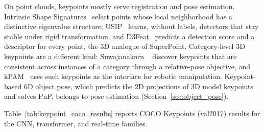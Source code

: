 On point clouds, keypoints mostly serve registration and pose estimation. Intrinsic Shape Signatures~\cite{zhong2009iss} select points whose local neighborhood has a distinctive eigenvalue structure; USIP~\cite{li2019usip} learns, without labels, detectors that stay stable under rigid transformation, and D3Feat~\cite{bai2020d3feat} predicts a detection score and a descriptor for every point, the 3D analogue of SuperPoint. Category-level 3D keypoints are a different kind: Suwajanakorn \etal~\cite{suwajanakorn2018discovery} discover keypoints that are consistent across instances of a category through a relative-pose objective, and kPAM~\cite{manuelli2019kpam} uses such keypoints as the interface for robotic manipulation. Keypoint-based 6D object pose, which predicts the 2D projections of 3D model keypoints and solves PnP, belongs to pose estimation (Section~\ref{sec:object_pose}).

Table~\ref{tab:keypoint_coco_results} reports COCO Keypoints (val2017) results for the CNN, transformer, and real-time families.

